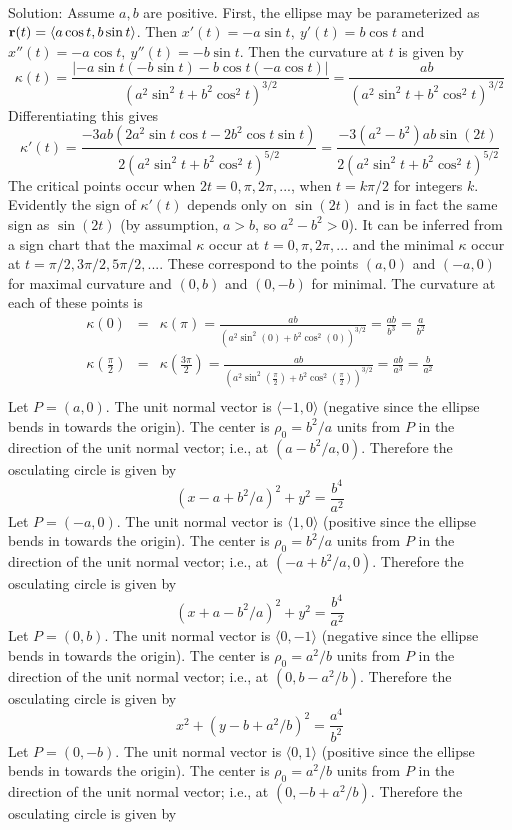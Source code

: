 \documentclass[12pt]{amsbook}
\newcommand{\la}{\langle}
\newcommand{\ra}{\rangle}
\begin{document}
\\
{\sc Solution}: Assume $a,b$ are positive. First, the ellipse may be parameterized as ${\bf r}(t)=\la a\cos t, b\sin t\ra$. Then $x'(t)=-a\sin t, \ y'(t)= b\cos t$ and $x''(t)=-a\cos t, \ y''(t)=-b\sin t$. Then the curvature at $t$ is given by
$$\kappa(t)=\frac{|-a\sin t(-b \sin t)-b\cos t(-a\cos t)|}{(a^2\sin^2t+b^2\cos^2t)^{3/2}}=\frac{ab}{(a^2\sin^2t+b^2\cos^2t)^{3/2}}$$
Differentiating this gives
$$\kappa'(t)=\frac{-3ab(2a^2\sin t\cos t-2b^2\cos t\sin t)}{2(a^2\sin^2t+b^2\cos^2t)^{5/2}}=\frac{-3(a^2-b^2)ab\sin (2t)}{2(a^2\sin^2t+b^2\cos^2t)^{5/2}}$$
The critical points occur when $2t=0,\pi,2\pi,...$, when $t=k\pi/2$ for integers $k$. Evidently the sign of $\kappa'(t)$ depends only on $\sin (2t)$ and is in fact the same sign as $\sin (2t)$ (by assumption, $a>b$, so $a^2-b^2>0$). It can be inferred from a sign chart that the maximal $\kappa$ occur at $t=0, \pi, 2\pi, ...$ and the minimal $\kappa$ occur at $t=\pi/2, 3\pi/2, 5\pi/2,...$. These correspond to the points $(a,0)$ and $(-a,0)$ for maximal curvature and $(0,b)$ and $(0,-b)$ for minimal. The curvature at each of these points is
\begin{eqnarray*}
\kappa(0)&=&\kappa(\pi)=\frac{ab}{(a^2\sin^2(0)+b^2\cos^2(0))^{3/2}}=\frac{ab}{b^3}=\frac{a}{b^2}\\
\kappa(\frac{\pi}{2})&=&\kappa(\frac{3\pi}{2})=\frac{ab}{(a^2\sin^2(\frac{\pi}{2})+b^2\cos^2(\frac{\pi}{2}))^{3/2}}=\frac{ab}{a^3}=\frac{b}{a^2}\\
\end{eqnarray*}
Let $P=(a,0)$. The unit normal vector is $\la -1,0 \ra$ (negative since the ellipse bends in towards the origin). The center is $\rho_0=b^2/a$ units from $P$ in the direction of the unit normal vector; i.e., at $(a-b^2/a,0)$. Therefore the osculating circle is given by
$$(x-a+b^2/a)^2+y^2=\frac{b^4}{a^2}$$
Let $P=(-a,0)$. The unit normal vector is $\la 1,0 \ra$ (positive since the ellipse bends in towards the origin). The center is $\rho_0=b^2/a$ units from $P$ in the direction of the unit normal vector; i.e., at $(-a+b^2/a,0)$. Therefore the osculating circle is given by
$$(x+a-b^2/a)^2+y^2=\frac{b^4}{a^2}$$
Let $P=(0,b)$. The unit normal vector is $\la 0,-1 \ra$ (negative since the ellipse bends in towards the origin). The center is $\rho_0=a^2/b$ units from $P$ in the direction of the unit normal vector; i.e., at $(0,b-a^2/b)$. Therefore the osculating circle is given by
$$x^2+(y-b+a^2/b)^2=\frac{a^4}{b^2}$$
Let $P=(0,-b)$. The unit normal vector is $\la 0,1 \ra$ (positive since the ellipse bends in towards the origin). The center is $\rho_0=a^2/b$ units from $P$ in the direction of the unit normal vector; i.e., at $(0,-b+a^2/b)$. Therefore the osculating circle is given by
\end{document}
